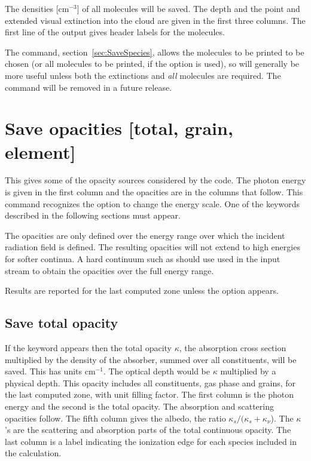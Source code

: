 The densities [cm$^{-3}$] of all molecules will be saved.  The depth and
the point and extended visual extinction into the cloud are given in the
first three columns.  The first line of the output gives header labels for
the molecules.

The  command, section~\ref{sec:SaveSpecies},
allows the molecules to be printed to be chosen (or all molecules to
be printed, if the  option is used), so will generally
be more useful unless both the extinctions and {\em all}\/ molecules
are required.  The  command will be removed
in a future release.

\section{Save opacities [total, grain, element]}

This gives some of the opacity sources considered by the code. The photon
energy is given in the first column and the opacities are in the columns that
follow. This command recognizes the  option to change the
energy scale. One of the keywords described in the following sections must
appear.

The opacities are only defined over the energy range over which the incident
radiation field is defined. The resulting opacities will not extend to high energies
for softer continua. A hard continuum such as  should use
used in the input stream to obtain the opacities over the full energy range.

Results are reported for the last computed zone unless the  option
appears.

\subsection{Save total opacity}

If the keyword  appears then the total opacity $\kappa$,
the absorption
cross section multiplied by the density of the absorber, summed over all
constituents, will be saved.
This has units cm$^{-1}$.
The optical depth would
be $\kappa $ multiplied by a physical depth.  This opacity includes all constituents,
gas phase and grains, for the last computed zone, with unit filling factor.
The first column is the photon energy and the second is the total opacity.
The absorption and scattering opacities follow.  The fifth column gives
the albedo, the ratio $\kappa _s /( {\kappa _s  + \kappa _\nu  }$).   The
$\kappa $'s are the scattering and absorption parts of the total continuous
opacity.  The last column is a label indicating the ionization edge for
each species included in the calculation.

